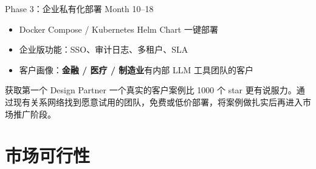 \documentclass[12pt,aspectratio=169,utf8]{beamer}
\begin{document}
\begin{frame}{Phase 3：企业私有化部署 \hfill Month 10--18}
  \footnotesize
  \begin{itemize}
    \item Docker Compose / Kubernetes Helm Chart 一键部署
    \item 企业版功能：SSO、审计日志、多租户、SLA
    \item 客户画像：\textbf{金融 / 医疗 / 制造业}有内部 LLM 工具团队的客户
  \end{itemize}

  \vspace{8pt}
  \begin{exampleblock}{获取第一个 Design Partner}
    \small 一个真实的客户案例比 1000 个 star 更有说服力。通过现有关系网络找到愿意试用的团队，免费或低价部署，将案例做扎实后再进入市场推广阶段。
  \end{exampleblock}
\end{frame}

\section{市场可行性}
\end{document}
